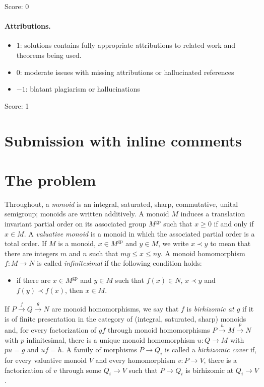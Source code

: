 \documentclass[11pt]{article}
\theoremstyle{definition}
\theoremstyle{remark}
\newcommand{\gp}{\mathrm{gp}}
\begin{document}
\noindent Score: 0

\paragraph{Attributions.}
\begin{itemize}
	\item  1: solutions contains fully appropriate attributions
		to related work and theorems being used.
	\item  0: moderate issues with missing attributions or hallucinated references
	\item  $-1$: blatant plagiarism or hallucinations
\end{itemize}

\noindent Score: 1

\newpage
\section{Submission with inline comments}


\section{The problem}

Throughout, a \emph{monoid} is an integral, saturated, sharp, commutative, unital semigroup; monoids are written additively. A monoid $M$ induces a translation invariant partial order on its associated group $M^{\gp}$ such that $x\ge 0$ if and only if $x\in M$. A \emph{valuative monoid} is a monoid in which the associated partial order is a total order. If $M$ is a monoid, $x\in M^{\gp}$ and $y\in M$, we write $x\prec y$ to mean that there are integers $m$ and $n$ such that $my\le x\le ny$. A monoid homomorphism $f\colon M\to N$ is called \emph{infinitesimal} if the following condition holds:
\begin{itemize}
\item if there are $x\in M^{\gp}$ and $y\in M$ such that $f(x)\in N$, $x\prec y$ and $f(y)\prec f(x)$, then $x\in M$.
\end{itemize}
If $P\xrightarrow{f}Q\xrightarrow{g}N$ are monoid homomorphisms, we say that $f$ is \emph{birhizomic at $g$} if it is of finite presentation in the category of (integral, saturated, sharp) monoids and, for every factorization of $gf$ through monoid homomorphisms $P\xrightarrow{h}M\xrightarrow{p}N$ with $p$ infinitesimal, there is a unique monoid homomorphism $u\colon Q\to M$ with $pu=g$ and $uf=h$. A family of morphisms $P\to Q_i$ is called a \emph{birhizomic cover} if, for every valuative monoid $V$ and every homomorphism $v\colon P\to V$, there is a factorization of $v$ through some $Q_i\to V$ such that $P\to Q_i$ is birhizomic at $Q_i\to V$.
\end{document}
